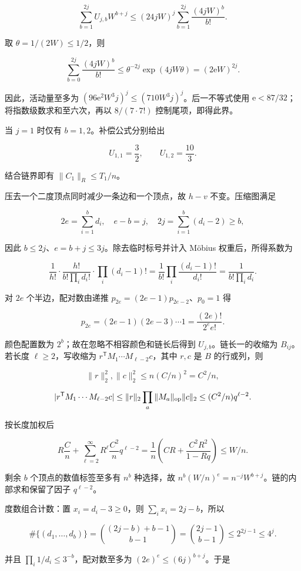 \documentclass[11pt,a4paper]{article}
\begin{document}
\[
\sum_{b=1}^{2j}U_{j,b}W^{b+j}
\le(24jW)^j
\sum_{b=1}^{2j}\frac{(4jW)^b}{b!}.
\]

取 \(\theta=1/(2W)\le1/2\)，则

\[
\sum_{b=0}^{2j}\frac{(4jW)^b}{b!}
\le\theta^{-2j}\exp(4jW\theta)
=(2\mathrm e W)^{2j}.
\]

因此，活动量至多为 \((96\mathrm e^2W^3j)^j\le(710W^3j)^j\)。后一不等式使用 \(\mathrm e<87/32\)；将指数级数求和至六次，再以 \(8/(7\cdot7!)\) 控制尾项，即得此界。

当 \(j=1\) 时仅有 \(b=1,2\)。补偿公式分别给出

\[
U_{1,1}=\frac32,\qquad U_{1,2}=\frac{10}{3}.
\]

结合链界即有 \(\|C_1\|_R\le T_1/n\)。

压去一个二度顶点同时减少一条边和一个顶点，故 \(h-v\) 不变。压缩图满足

\[
2e=\sum_{i=1}^bd_i,\quad e-b=j,\quad
2j=\sum_{i=1}^b(d_i-2)\ge b,
\]

因此 \(b\le2j\)、\(e=b+j\le3j\)。除去临时标号并计入 Möbius 权重后，所得系数为

\[
\frac1{h!}\cdot\frac{h!}{b!\prod_i d_i!}\cdot\prod_i(d_i-1)!
=\frac1{b!}\prod_i\frac{(d_i-1)!}{d_i!}
=\frac1{b!\prod_i d_i}.
\]

对 \(2e\) 个半边，配对数由递推 \(p_{2e}=(2e-1)p_{2e-2}\)、\(p_0=1\) 得

\[
p_{2e}=(2e-1)(2e-3)\cdots1=\frac{(2e)!}{2^ee!}.
\]

颜色配置数为 \(2^b\)；故在忽略不相容颜色和链长后得到 \(U_{j,b}\)。链长一的收缩为 \(B_{ij}\)。若长度 \(\ell\ge2\)，写收缩为 \(r^{\mathsf T}M_1\cdots M_{\ell-2}c\)，其中 \(r,c\) 是 \(B\) 的行或列，则

\[
\|r\|_2^2,\|c\|_2^2\le n(C/n)^2=C^2/n,
\]

\[
|r^{\mathsf T}M_1\cdots M_{\ell-2}c|
\le\|r\|_2\prod_a\|M_a\|_{\rm op}\|c\|_2
\le(C^2/n)q^{\ell-2}.
\]

按长度加权后

\[
R\frac Cn+\sum_{\ell=2}^{\infty}R^\ell\frac{C^2}nq^{\ell-2}
=\frac1n\left(CR+\frac{C^2R^2}{1-Rq}\right)\le W/n.
\]

剩余 \(b\) 个顶点的数值标签至多有 \(n^b\) 种选择，故 \(n^b(W/n)^e=n^{-j}W^{b+j}\)。链的内部求和保留了因子 \(q^{\ell-2}\)。

度数组合计数：置 \(x_i=d_i-3\ge0\)，则 \(\sum_ix_i=2j-b\)，所以

\[
\#\{(d_1,\ldots,d_b)\}=\binom{(2j-b)+b-1}{b-1}
=\binom{2j-1}{b-1}\le2^{2j-1}\le4^j.
\]

并且 \(\prod_i1/d_i\le3^{-b}\)，配对数至多为 \((2e)^e\le(6j)^{b+j}\)。于是
\end{document}
